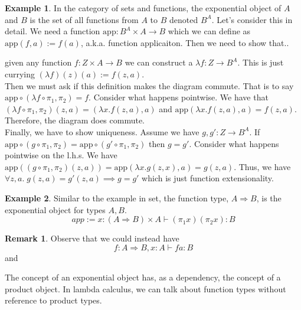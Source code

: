 \documentclass[12pt]{article}
\theoremstyle{definition}
\newtheorem{remark}{Remark}[section]
\newtheorem{example}{Example}[section]
\newcommand{\app}{\mathrm{app}}
\begin{document}
\begin{example}
    In the category of sets and functions, the exponential object of $A$ and $B$ is the set of all functions from $A$ to $B$ denoted $B^A$. Let's consider this in detail. We need a function $\app : B^A \times A \to B$ which we can define as $\app(f,a):= f(a)$, a.k.a. function applicaiton. Then we need to show that..
\begin{prooftree}
\end{prooftree}
given any function $f : Z \times A \to B$ we can construct a $\lambda f : Z \to B^A$. This is just currying $(\lambda f)(z)(a) := f(z,a)$. \\
Then we must ask if this definition makes the diagram commute. That is to say $\app \circ (\lambda f \circ \pi_1, \pi_2) = f$. Consider what happens pointwise. We have that $(\lambda f \circ \pi_1,\pi_2)(z,a)= (\lambda x . f(z,a),a)$ and $\app(\lambda x. f(z,a),a)= f(z,a)$. Therefore, the diagram does commute.\\
Finally, we have to show uniqueness. Assume we have $g,g' : Z \to B^A$. If $\app \circ (g \circ \pi_1, \pi_2) = \app \circ (g' \circ \pi_1, \pi_2)$ then $g = g'$. Consider what happens pointwise on the l.h.s. We have $\app((g\circ \pi_1,\pi_2)(z,a))=\app(\lambda x. g(z,x),a)=g(z,a)$. Thus, we have $\forall z,a.\; g(z,a)=g'(z,a) \implies g = g'$ which is just function extensionality.
\end{example}

\begin{example}
    Similar to the example in set, the function type, $A \Rightarrow B$, is the exponential object for types $A,B$. 
    \[
        app := x : (A \Rightarrow B)\times A \vdash (\pi_1 x)(\pi_2 x) : B
        \]
    \begin{prooftree}
    \end{prooftree}
\end{example}
    \begin{remark}
        
Observe that we could instead have
\[
    f : A \Rightarrow B, x : A \vdash f a : B
\]
and
\begin{prooftree}
\end{prooftree}
The concept of an exponential object has, as a dependency, the concept of a product object. In lambda calculus, we can talk about function types without reference to product types.
\end{remark}
\end{document}
